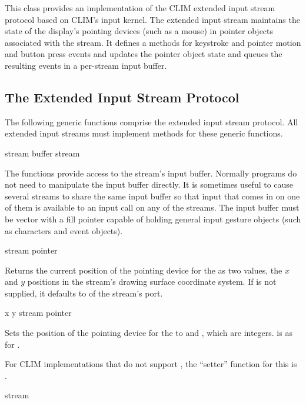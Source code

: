 This class provides an implementation of the CLIM extended input stream protocol
based on CLIM's input kernel.  The extended input stream maintains the state of
the display's pointing devices (such as a mouse) in pointer objects associated
with the stream.  It defines a  methods for keystroke and
pointer motion and button press events and updates the pointer object state and
queues the resulting events in a per-stream input buffer.

\Mutable


\subsection {The Extended Input Stream Protocol}

The following generic functions comprise the extended input stream protocol.
All extended input streams must implement methods for these generic functions.

 {stream}
 {buffer stream}

The functions provide access to the stream's input buffer.  Normally programs do
not need to manipulate the input buffer directly.  It is sometimes useful to
cause several streams to share the same input buffer so that input that comes in
on one of them is available to an input call on any of the streams.  The input
buffer must be vector with a fill pointer capable of holding general input
gesture objects (such as characters and event objects).

 {stream \key pointer}

Returns the current position of the pointing device  for the
  as two values, the $x$ and $y$
positions in the stream's drawing surface coordinate system.  If 
is not supplied, it defaults to  of the stream's port.

 {x y stream \key pointer}

Sets the position of the pointing device for the 
 to  and , which are integers.   is as
for .

For CLIM implementations that do not support , the ``setter'' function
for this is .

 {stream}

